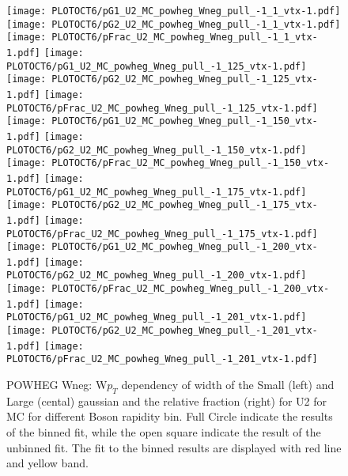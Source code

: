 \documentclass[41pt,a4paper,oneside]{report}
\begin{document}
\begin{figure}[h!]
  \begin{center}
    \texttt{[image: PLOTOCT6/pG1\_U2\_MC\_powheg\_Wneg\_pull\_-1\_1\_vtx-1.pdf]}
    \texttt{[image: PLOTOCT6/pG2\_U2\_MC\_powheg\_Wneg\_pull\_-1\_1\_vtx-1.pdf]}
    \texttt{[image: PLOTOCT6/pFrac\_U2\_MC\_powheg\_Wneg\_pull\_-1\_1\_vtx-1.pdf]} 
    \texttt{[image: PLOTOCT6/pG1\_U2\_MC\_powheg\_Wneg\_pull\_-1\_125\_vtx-1.pdf]}
    \texttt{[image: PLOTOCT6/pG2\_U2\_MC\_powheg\_Wneg\_pull\_-1\_125\_vtx-1.pdf]}
    \texttt{[image: PLOTOCT6/pFrac\_U2\_MC\_powheg\_Wneg\_pull\_-1\_125\_vtx-1.pdf]} 
    \texttt{[image: PLOTOCT6/pG1\_U2\_MC\_powheg\_Wneg\_pull\_-1\_150\_vtx-1.pdf]}
    \texttt{[image: PLOTOCT6/pG2\_U2\_MC\_powheg\_Wneg\_pull\_-1\_150\_vtx-1.pdf]}
    \texttt{[image: PLOTOCT6/pFrac\_U2\_MC\_powheg\_Wneg\_pull\_-1\_150\_vtx-1.pdf]} 
    \texttt{[image: PLOTOCT6/pG1\_U2\_MC\_powheg\_Wneg\_pull\_-1\_175\_vtx-1.pdf]}
    \texttt{[image: PLOTOCT6/pG2\_U2\_MC\_powheg\_Wneg\_pull\_-1\_175\_vtx-1.pdf]}
    \texttt{[image: PLOTOCT6/pFrac\_U2\_MC\_powheg\_Wneg\_pull\_-1\_175\_vtx-1.pdf]} 
    \texttt{[image: PLOTOCT6/pG1\_U2\_MC\_powheg\_Wneg\_pull\_-1\_200\_vtx-1.pdf]}
    \texttt{[image: PLOTOCT6/pG2\_U2\_MC\_powheg\_Wneg\_pull\_-1\_200\_vtx-1.pdf]}
    \texttt{[image: PLOTOCT6/pFrac\_U2\_MC\_powheg\_Wneg\_pull\_-1\_200\_vtx-1.pdf]} 
    \texttt{[image: PLOTOCT6/pG1\_U2\_MC\_powheg\_Wneg\_pull\_-1\_201\_vtx-1.pdf]}
    \texttt{[image: PLOTOCT6/pG2\_U2\_MC\_powheg\_Wneg\_pull\_-1\_201\_vtx-1.pdf]}
    \texttt{[image: PLOTOCT6/pFrac\_U2\_MC\_powheg\_Wneg\_pull\_-1\_201\_vtx-1.pdf]} 
    \caption{POWHEG Wneg: W$p_{T}$ dependency of width of the Small (left) and Large (cental) gaussian and the relative fraction (right) for U2 for MC for different Boson rapidity bin. Full Circle indicate the results of the binned fit, while the open square indicate the result of the unbinned fit. The fit to the binned results are displayed with red line and yellow band. {\color{blue}{plot oder than OCT6}}
\newline
}
    \label{fig:SmallLargeU2POWneg}
  \end{center}
\end{figure}
\end{document}
